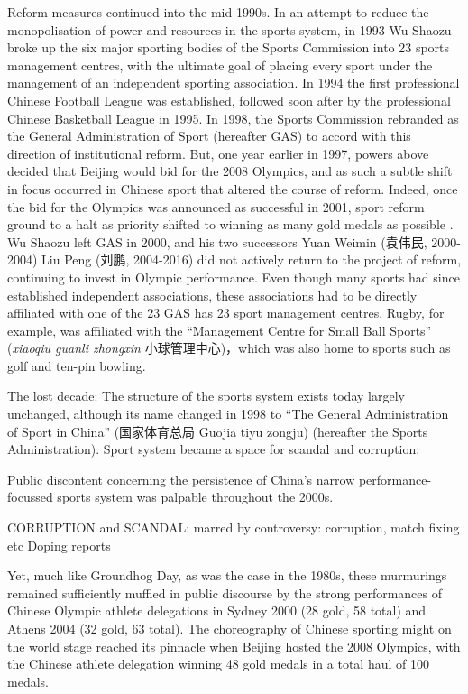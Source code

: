     Reform measures continued into the mid 1990s. In an attempt to reduce the monopolisation of power and resources in the sports system, in 1993 Wu Shaozu broke up the six major sporting bodies of the Sports Commission into 23 sports management centres, with the ultimate goal of placing every sport under the management of an independent sporting association. In 1994 the first professional Chinese Football League was established, followed soon after by the professional Chinese Basketball League in 1995. In 1998, the Sports Commission rebranded as the General Administration of Sport (hereafter GAS) to accord with this direction of institutional reform.  But, one year earlier in 1997, powers above decided that Beijing would bid for the 2008 Olympics, and as such a subtle shift in focus occurred in Chinese sport that altered the course of reform.  Indeed, once the bid for the Olympics was announced as successful in 2001, sport reform ground to a halt as priority shifted to winning as many gold medals as possible \citep{News2017}.  Wu Shaozu left GAS in 2000, and his two successors Yuan Weimin (袁伟民, 2000-2004) Liu Peng
    (刘鹏, 2004-2016) did not actively return to the project of reform, continuing to invest in Olympic performance.  Even though many sports had since established independent associations, these associations had to be directly affiliated with one of the 23 GAS has 23 sport management centres. Rugby, for example, was affiliated with the ``Management Centre for Small Ball Sports'' (\textit{xiaoqiu guanli zhongxin} 小球管理中心)，which was also home to sports such as golf and ten-pin bowling.


    The lost decade:
    The structure of the sports system exists today largely unchanged, although its name changed in 1998 to “The General Administration of Sport in China” (国家体育总局 Guojia tiyu zongju) (hereafter the Sports Administration).
    Sport system became a space for scandal and corruption:

    Public discontent concerning the persistence of China's narrow performance-focussed sports system was palpable throughout the 2000s.

    CORRUPTION and SCANDAL:
    marred by controversy:
    corruption, match fixing etc
    Doping reports

    Yet, much like Groundhog Day, as was the case in the 1980s, these murmurings remained sufficiently muffled in public discourse by the strong performances of Chinese Olympic athlete delegations in Sydney 2000 (28 gold, 58 total) and Athens 2004 (32 gold, 63 total). The choreography of Chinese sporting might on the world stage reached its pinnacle when Beijing hosted the 2008 Olympics, with the Chinese athlete delegation winning 48 gold medals in a total haul of 100 medals.

